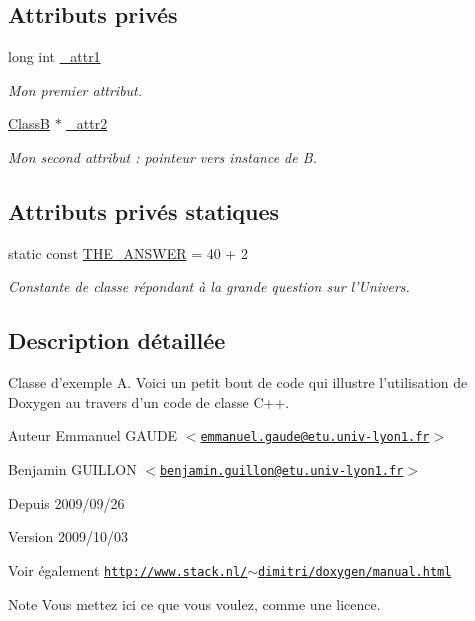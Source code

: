 \subsection*{Attributs privés}
\begin{DoxyCompactItemize}
\item 
long int \hyperlink{class_class_a_ab13fa04135597d1b015171ee7e823804}{\_\-attr1}
\begin{DoxyCompactList}\small\item\em Mon premier attribut. \item\end{DoxyCompactList}\item 
\hyperlink{class_class_b}{ClassB} $\ast$ \hyperlink{class_class_a_a705a48160d35a8656f1196967a3f11ab}{\_\-attr2}
\begin{DoxyCompactList}\small\item\em Mon second attribut : pointeur vers instance de B. \item\end{DoxyCompactList}\end{DoxyCompactItemize}
\subsection*{Attributs privés statiques}
\begin{DoxyCompactItemize}
\item 
static const \hyperlink{class_class_a_a37b03b75edb033b486bdbaeb5019cc08}{THE\_\-ANSWER} = 40 + 2
\begin{DoxyCompactList}\small\item\em Constante de classe répondant à la grande question sur l'Univers. \item\end{DoxyCompactList}\end{DoxyCompactItemize}


\subsection{Description détaillée}
Classe d'exemple A. Voici un petit bout de code qui illustre l'utilisation de Doxygen au travers d'un code de classe C++. \begin{DoxyAuthor}{Auteur}
Emmanuel GAUDE $<$\href{mailto:emmanuel.gaude@etu.univ-lyon1.fr}{\tt emmanuel.gaude@etu.univ-\/lyon1.fr}$>$ 

Benjamin GUILLON $<$\href{mailto:benjamin.guillon@etu.univ-lyon1.fr}{\tt benjamin.guillon@etu.univ-\/lyon1.fr}$>$ 
\end{DoxyAuthor}
\begin{DoxySince}{Depuis}
2009/09/26 
\end{DoxySince}
\begin{DoxyVersion}{Version}
2009/10/03
\end{DoxyVersion}
\begin{DoxySeeAlso}{Voir également}
\href{http://www.stack.nl/~dimitri/doxygen/manual.html}{\tt http://www.stack.nl/$\sim$dimitri/doxygen/manual.html} 
\end{DoxySeeAlso}
\begin{DoxyNote}{Note}
Vous mettez ici ce que vous voulez, comme une licence. 
\end{DoxyNote}


